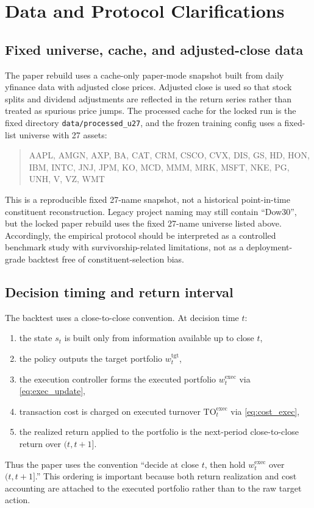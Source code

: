 \documentclass[10pt,twocolumn]{article}
\newcommand{\wexec}{w^{\mathrm{exec}}}
\newcommand{\wtgt}{w^{\mathrm{tgt}}}
\newcommand{\TOexec}{\mathrm{TO}^{\mathrm{exec}}}
\begin{document}
\section{Data and Protocol Clarifications}
\label{app:data_protocol}
\subsection{Fixed universe, cache, and adjusted-close data}
The paper rebuild uses a cache-only paper-mode snapshot built from daily yfinance data with adjusted close prices. Adjusted close is used so that stock splits and dividend adjustments are reflected in the return series rather than treated as spurious price jumps. The processed cache for the locked run is the fixed directory \texttt{data/processed\_u27}, and the frozen training config uses a fixed-list universe with 27 assets:

\begin{quote}
\small\ttfamily
AAPL, AMGN, AXP, BA, CAT, CRM, CSCO, CVX, DIS, GS, HD, HON, IBM, INTC, JNJ, JPM, KO, MCD, MMM, MRK, MSFT, NKE, PG, UNH, V, VZ, WMT
\end{quote}
This is a reproducible fixed 27-name snapshot, not a historical point-in-time constituent reconstruction. Legacy project naming may still contain ``Dow30'', but the locked paper rebuild uses the fixed 27-name universe listed above. Accordingly, the empirical protocol should be interpreted as a controlled benchmark study with survivorship-related limitations, not as a deployment-grade backtest free of constituent-selection bias.

\subsection{Decision timing and return interval}
The backtest uses a close-to-close convention. At decision time $t$:
\begin{enumerate}[leftmargin=*,itemsep=1pt]
\item the state $s_t$ is built only from information available up to close $t$,
\item the policy outputs the target portfolio $\wtgt_t$,
\item the execution controller forms the executed portfolio $\wexec_t$ via \eqref{eq:exec_update},
\item transaction cost is charged on executed turnover $\TOexec_t$ via \eqref{eq:cost_exec},
\item the realized return applied to the portfolio is the next-period close-to-close return over $(t,t+1]$.
\end{enumerate}
Thus the paper uses the convention ``decide at close $t$, then hold $\wexec_t$ over $(t,t+1]$.'' This ordering is important because both return realization and cost accounting are attached to the executed portfolio rather than to the raw target action.
\end{document}
